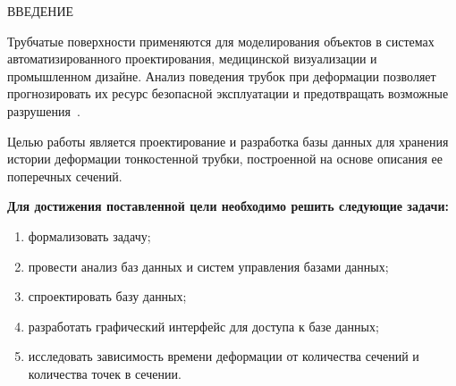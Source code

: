 \begin{center}
    \MakeUppercase{\large Введение}
\end{center}

\noindent
\hspace{1.25cm}
Трубчатые поверхности применяются для моделирования объектов
в системах автоматизированного проектирования, медицинской визуализации и промышленном дизайне. Анализ поведения трубок при деформации позволяет прогнозировать их ресурс безопасной эксплуатации и предотвращать возможные разрушения~\cite{saruev_rudachenko}. 

\noindent
\hspace{1.25cm}
Целью работы является проектирование и разработка базы данных для хранения истории деформации тонкостенной трубки, построенной на основе описания ее поперечных сечений.

\noindent
\hspace{1.25cm}
\textbf{Для достижения поставленной цели необходимо решить следующие задачи:}

\renewcommand{\labelenumi}{\theenumi}
\begin{enumerate}

\item формализовать задачу;

\item провести анализ баз данных и систем управления базами данных;

\item спроектировать базу данных;

\item разработать графический интерфейс для доступа к базе данных;

\item исследовать зависимость времени деформации от количества сечений и количества точек в сечении.

\end{enumerate}

\newpage
